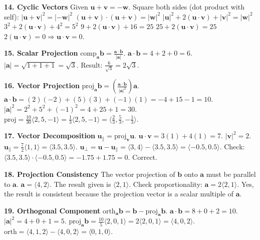 \documentclass[12pt]{article}
\begin{document}
\textbf{14. Cyclic Vectors}
Given $\mathbf{u} + \mathbf{v} = -\mathbf{w}$.
Square both sides (dot product with self):
$|\mathbf{u} + \mathbf{v}|^2 = |-\mathbf{w}|^2$
$(\mathbf{u} + \mathbf{v}) \cdot (\mathbf{u} + \mathbf{v}) = |\mathbf{w}|^2$
$|\mathbf{u}|^2 + 2(\mathbf{u} \cdot \mathbf{v}) + |\mathbf{v}|^2 = |\mathbf{w}|^2$
$3^2 + 2(\mathbf{u} \cdot \mathbf{v}) + 4^2 = 5^2$
$9 + 2(\mathbf{u} \cdot \mathbf{v}) + 16 = 25$
$25 + 2(\mathbf{u} \cdot \mathbf{v}) = 25$
$2(\mathbf{u} \cdot \mathbf{v}) = 0 \Rightarrow \mathbf{u} \cdot \mathbf{v} = 0$.

\textbf{15. Scalar Projection}
$\text{comp}_{\mathbf{a}}\mathbf{b} = \frac{\mathbf{a} \cdot \mathbf{b}}{|\mathbf{a}|}$.
$\mathbf{a} \cdot \mathbf{b} = 4 + 2 + 0 = 6$.
$|\mathbf{a}| = \sqrt{1+1+1} = \sqrt{3}$.
Result: $\frac{6}{\sqrt{3}} = 2\sqrt{3}$.

\textbf{16. Vector Projection}
$\text{proj}_{\mathbf{a}}\mathbf{b} = \left( \frac{\mathbf{a} \cdot \mathbf{b}}{|\mathbf{a}|^2} \right) \mathbf{a}$.
$\mathbf{a} \cdot \mathbf{b} = (2)(-2) + (5)(3) + (-1)(1) = -4 + 15 - 1 = 10$.
$|\mathbf{a}|^2 = 2^2 + 5^2 + (-1)^2 = 4 + 25 + 1 = 30$.
$\text{proj} = \frac{10}{30} \langle 2, 5, -1 \rangle = \frac{1}{3} \langle 2, 5, -1 \rangle = \langle \frac{2}{3}, \frac{5}{3}, -\frac{1}{3} \rangle$.

\textbf{17. Vector Decomposition}
$\mathbf{u}_{\parallel} = \text{proj}_{\mathbf{v}} \mathbf{u}$.
$\mathbf{u} \cdot \mathbf{v} = 3(1) + 4(1) = 7$. $|\mathbf{v}|^2 = 2$.
$\mathbf{u}_{\parallel} = \frac{7}{2} \langle 1, 1 \rangle = \langle 3.5, 3.5 \rangle$.
$\mathbf{u}_{\perp} = \mathbf{u} - \mathbf{u}_{\parallel} = \langle 3, 4 \rangle - \langle 3.5, 3.5 \rangle = \langle -0.5, 0.5 \rangle$.
Check: $\langle 3.5, 3.5 \rangle \cdot \langle -0.5, 0.5 \rangle = -1.75 + 1.75 = 0$. Correct.

\textbf{18. Projection Consistency}
The vector projection of $\mathbf{b}$ onto $\mathbf{a}$ must be parallel to $\mathbf{a}$.
$\mathbf{a} = \langle 4, 2 \rangle$. The result given is $\langle 2, 1 \rangle$.
Check proportionality: $\mathbf{a} = 2 \langle 2, 1 \rangle$.
Yes, the result is consistent because the projection vector is a scalar multiple of $\mathbf{a}$.

\textbf{19. Orthogonal Component}
$\text{orth}_{\mathbf{a}}\mathbf{b} = \mathbf{b} - \text{proj}_{\mathbf{a}}\mathbf{b}$.
$\mathbf{a} \cdot \mathbf{b} = 8 + 0 + 2 = 10$. $|\mathbf{a}|^2 = 4 + 0 + 1 = 5$.
$\text{proj}_{\mathbf{a}}\mathbf{b} = \frac{10}{5} \langle 2, 0, 1 \rangle = 2 \langle 2, 0, 1 \rangle = \langle 4, 0, 2 \rangle$.
$\text{orth} = \langle 4, 1, 2 \rangle - \langle 4, 0, 2 \rangle = \langle 0, 1, 0 \rangle$.
\end{document}
